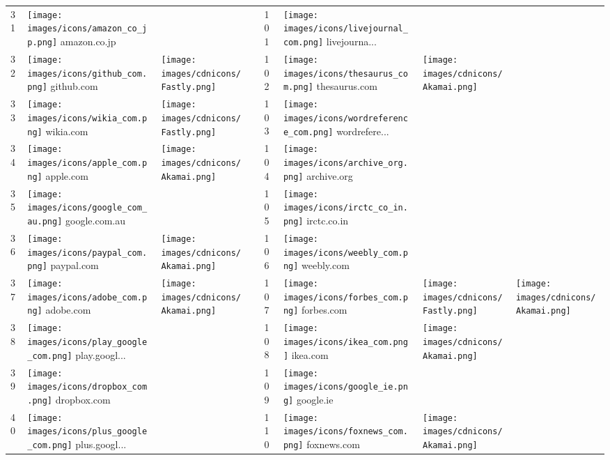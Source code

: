 \begin{table}[tbp]
\begin{tabular}{|llll|llll|}
31 & \texttt{[image: images/icons/amazon\_co\_jp.png]} amazon.co.jp & & & 101 & \texttt{[image: images/icons/livejournal\_com.png]} livejourna... & & \\
32 & \texttt{[image: images/icons/github\_com.png]} github.com & \texttt{[image: images/cdnicons/Fastly.png]} & & 102 & \texttt{[image: images/icons/thesaurus\_com.png]} thesaurus.com & \texttt{[image: images/cdnicons/Akamai.png]} & \\
33 & \texttt{[image: images/icons/wikia\_com.png]} wikia.com & \texttt{[image: images/cdnicons/Fastly.png]} & & 103 & \texttt{[image: images/icons/wordreference\_com.png]} wordrefere... & & \\
34 & \texttt{[image: images/icons/apple\_com.png]} apple.com & \texttt{[image: images/cdnicons/Akamai.png]} & & 104 & \texttt{[image: images/icons/archive\_org.png]} archive.org & & \\
35 & \texttt{[image: images/icons/google\_com\_au.png]} google.com.au & & & 105 & \texttt{[image: images/icons/irctc\_co\_in.png]} irctc.co.in & & \\
36 & \texttt{[image: images/icons/paypal\_com.png]} paypal.com & \texttt{[image: images/cdnicons/Akamai.png]} & & 106 & \texttt{[image: images/icons/weebly\_com.png]} weebly.com & & \\
37 & \texttt{[image: images/icons/adobe\_com.png]} adobe.com & \texttt{[image: images/cdnicons/Akamai.png]} & & 107 & \texttt{[image: images/icons/forbes\_com.png]} forbes.com & \texttt{[image: images/cdnicons/Fastly.png]} & \texttt{[image: images/cdnicons/Akamai.png]} \\
38 & \texttt{[image: images/icons/play\_google\_com.png]} play.googl... & & & 108 & \texttt{[image: images/icons/ikea\_com.png]} ikea.com & \texttt{[image: images/cdnicons/Akamai.png]} & \\
39 & \texttt{[image: images/icons/dropbox\_com.png]} dropbox.com & & & 109 & \texttt{[image: images/icons/google\_ie.png]} google.ie & & \\
40 & \texttt{[image: images/icons/plus\_google\_com.png]} plus.googl... & & & 110 & \texttt{[image: images/icons/foxnews\_com.png]} foxnews.com & \texttt{[image: images/cdnicons/Akamai.png]} & \\

\end{tabular}
\end{table}
